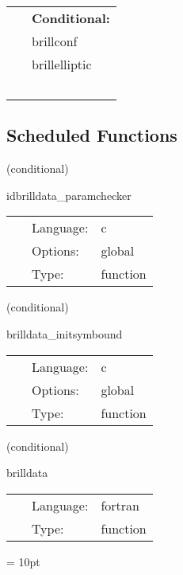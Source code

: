 \documentclass{article}
\begin{document}
 \begin{tabular*}{160mm}{ll} 
~& {\bf Conditional:} \\ 
~ &  brillconf\\ 
~ &  brillelliptic\\ 
~ & ~\\ 
\end{tabular*} 


\subsection*{Scheduled Functions}
\vspace{5mm}

   (conditional) 

\hspace{5mm} idbrilldata\_paramchecker 

\hspace{5mm}{\it check that the metric\_type is recognised } 


\hspace{5mm}

 \begin{tabular*}{160mm}{cll} 
~ & Language:  & c \\ 
~ & Options:  & global \\ 
~ & Type:  & function \\ 
\end{tabular*} 


\vspace{5mm}

   (conditional) 

\hspace{5mm} brilldata\_initsymbound 

\hspace{5mm}{\it set up symmetries for brillpsi } 


\hspace{5mm}

 \begin{tabular*}{160mm}{cll} 
~ & Language:  & c \\ 
~ & Options:  & global \\ 
~ & Type:  & function \\ 
\end{tabular*} 


\vspace{5mm}

   (conditional) 

\hspace{5mm} brilldata 

\hspace{5mm}{\it construct brill wave initial data } 


\hspace{5mm}

 \begin{tabular*}{160mm}{cll} 
~ & Language:  & fortran \\ 
~ & Type:  & function \\ 
\end{tabular*} 



\vspace{5mm}\parskip = 10pt 
\end{document}
